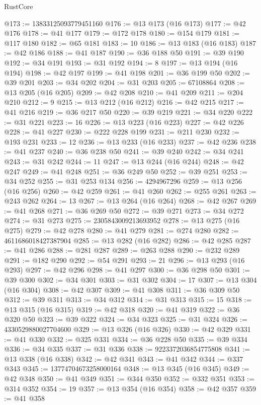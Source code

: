 \begin{lexlean}{RustCore}
\begin{coremodule}
@173 := 13833125093779451160
@176 := @13 @173 (@16 @173)
@177 := @42 @176
@178 := @41 @177
@179 := @172 @178
@180 := @154 @179
@181 := @117 @180
@182 := @65 @181
@183 := 10
@186 := @13 @183 (@16 @183)
@187 := @42 @186
@188 := @41 @187
@190 := @36 @188 @50
@191 := @39 @190
@192 := @34 @191
@193 := @31 @192
@194 := 8
@197 := @13 @194 (@16 @194)
@198 := @42 @197
@199 := @41 @198
@201 := @36 @199 @50
@202 := @39 @201
@203 := @34 @202
@204 := @31 @203
@205 := 67108864
@208 := @13 @205 (@16 @205)
@209 := @42 @208
@210 := @41 @209
@211 := @204 @210
@212 := 9
@215 := @13 @212 (@16 @212)
@216 := @42 @215
@217 := @41 @216
@219 := @36 @217 @50
@220 := @39 @219
@221 := @34 @220
@222 := @31 @221
@223 := 16
@226 := @13 @223 (@16 @223)
@227 := @42 @226
@228 := @41 @227
@230 := @222 @228 @199
@231 := @211 @230
@232 := @193 @231
@233 := 12
@236 := @13 @233 (@16 @233)
@237 := @42 @236
@238 := @41 @237
@240 := @36 @238 @50
@241 := @39 @240
@242 := @34 @241
@243 := @31 @242
@244 := 11
@247 := @13 @244 (@16 @244)
@248 := @42 @247
@249 := @41 @248
@251 := @36 @249 @50
@252 := @39 @251
@253 := @34 @252
@255 := @31 @253 @134
@256 := 4294967296
@259 := @13 @256 (@16 @256)
@260 := @42 @259
@261 := @41 @260
@262 := @255 @261
@263 := @243 @262
@264 := 13
@267 := @13 @264 (@16 @264)
@268 := @42 @267
@269 := @41 @268
@271 := @36 @269 @50
@272 := @39 @271
@273 := @34 @272
@274 := @31 @273
@275 := 2305843009213693952
@278 := @13 @275 (@16 @275)
@279 := @42 @278
@280 := @41 @279
@281 := @274 @280
@282 := 4611686018427387904
@285 := @13 @282 (@16 @282)
@286 := @42 @285
@287 := @41 @286
@288 := @281 @287
@289 := @263 @288
@290 := @232 @289
@291 := @182 @290
@292 := @54 @291
@293 := 21
@296 := @13 @293 (@16 @293)
@297 := @42 @296
@298 := @41 @297
@300 := @36 @298 @50
@301 := @39 @300
@302 := @34 @301
@303 := @31 @302
@304 := 17
@307 := @13 @304 (@16 @304)
@308 := @42 @307
@309 := @41 @308
@311 := @36 @309 @50
@312 := @39 @311
@313 := @34 @312
@314 := @31 @313
@315 := 15
@318 := @13 @315 (@16 @315)
@319 := @42 @318
@320 := @41 @319
@322 := @36 @320 @50
@323 := @39 @322
@324 := @34 @323
@325 := @31 @324
@326 := 4330529880027704600
@329 := @13 @326 (@16 @326)
@330 := @42 @329
@331 := @41 @330
@332 := @325 @331
@334 := @36 @228 @50
@335 := @39 @334
@336 := @34 @335
@337 := @31 @336
@338 := 9223372036854775808
@341 := @13 @338 (@16 @338)
@342 := @42 @341
@343 := @41 @342
@344 := @337 @343
@345 := 13774704673258000164
@348 := @13 @345 (@16 @345)
@349 := @42 @348
@350 := @41 @349
@351 := @344 @350
@352 := @332 @351
@353 := @314 @352
@354 := 19
@357 := @13 @354 (@16 @354)
@358 := @42 @357
@359 := @41 @358

\end{coremodule}
\end{lexlean}
